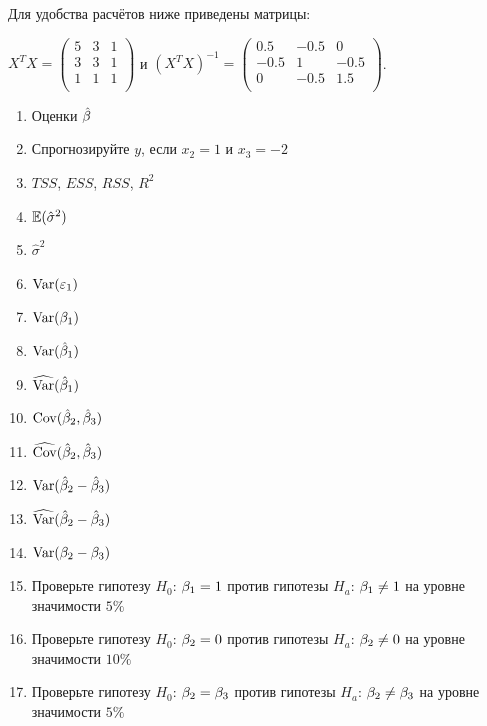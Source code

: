 \documentclass[12pt, a4paper]{article}\usepackage[]{graphicx}\usepackage[]{color}
\begin{document}
Для удобства расчётов ниже приведены матрицы:

$X^T X =  \begin{pmatrix}
5 & 3 & 1 \\
3 & 3 & 1 \\
1 & 1 & 1 \\
\end{pmatrix} $ и $(X^T X)^{-1} =  \begin{pmatrix}
0.5 & -0.5 & 0 \\
-0.5 & 1 & -0.5 \\
0 & -0.5 & 1.5 \\
\end{pmatrix} $.

\begin{enumerate}
\item Оценки $\hat{\beta}$
\item Спрогнозируйте $y$, если  $x_2=1$ и $x_3=-2$
\item $TSS$, $ESS$, $RSS$, $R^2$
\item $\mathbb{E} (\hat{\sigma}^2)$
\item $\hat{\sigma}^2$
\item $\operatorname{Var} (\varepsilon_1)$
\item $\operatorname{Var} (\beta_1)$
\item $\operatorname{Var} (\hat{\beta}_1)$
\item $\widehat{\operatorname{Var} }(\hat{\beta}_1)$
\item $\operatorname{Cov} (\hat{\beta}_2, \hat{\beta}_3)$
\item $\widehat{\operatorname{Cov} }(\hat{\beta}_2, \hat{\beta}_3)$
\item $\operatorname{Var} (\hat{\beta}_2 - \hat{\beta}_3)$
\item $\widehat{\operatorname{Var} }(\hat{\beta}_2 - \hat{\beta}_3)$
\item $\operatorname{Var} (\beta_2 - \beta_3)$
\item Проверьте гипотезу $H_0$: $\beta_1=1$ против гипотезы $H_a$: $\beta_1\neq 1$ на уровне значимости $5\%$
\item Проверьте гипотезу $H_0$: $\beta_2=0$ против гипотезы $H_a$: $\beta_2\neq 0$ на уровне значимости $10\%$
\item Проверьте гипотезу $H_0$: $\beta_2=\beta_3$ против гипотезы $H_a$: $\beta_2\neq \beta_3$ на уровне значимости $5\%$
\end{enumerate}
\end{document}
